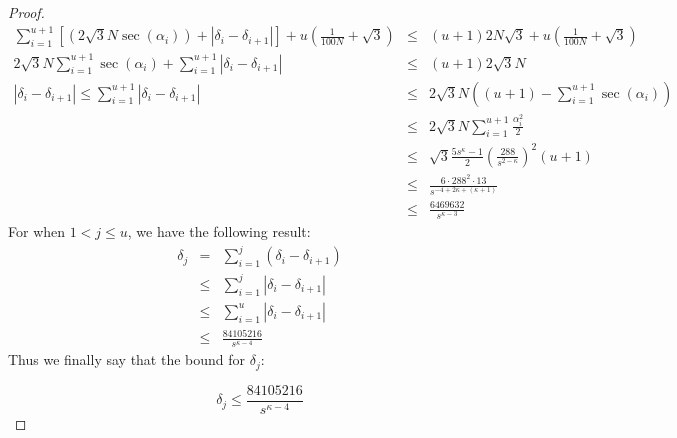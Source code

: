 \documentclass[10pt]{CSUNthesis}
\theoremstyle{plain}%
\theoremstyle{definition}
\theoremstyle{remark}
\newcommand{\lr}[1]{\left( #1 \right)}
\newcommand{\vlr}[1]{\left\vert #1 \right\vert}
\begin{document}
\begin{proof}
\begin{eqnarray*}
\sum_{i=1}^{u+1} \left[ \lr{2 \sqrt{3} N \sec \lr{ \alpha_i}} + \vlr{\delta_i - \delta_{i+1}} \right] + u \lr{\frac{1}{100N}+\sqrt{3}} &\leq& (u+1) 2 N \sqrt{3} + u  \lr{\frac{1}{100N}+\sqrt{3}}\\
2 \sqrt{3} N \sum_{i=1}^{u+1} \sec \lr{ \alpha_i} + \sum_{i=1}^{u+1} \vlr{\delta_i - \delta_{i+1}} &\leq& (u+1) 2 \sqrt{3} N \\
\vlr{\delta_i - \delta_{i+1}}\leq \sum_{i=1}^{u+1}\vlr{\delta_i - \delta_{i+1}} &\leq&  2 \sqrt{3} N \lr{(u+1) - \sum_{i=1}^{u+1} \sec \lr{ \alpha_i}}\\
&\leq& 2 \sqrt{3} N \sum_{i=1}^{u+1} \frac{\alpha_i^2}{2}\\
&\leq&  \sqrt{3} \frac{5s^\kappa - 1}{2} \lr{\frac{288}{s^{2-\kappa}}}^2 (u+1)\\ 
&\leq& \frac{6 \cdot 288^2 \cdot 13}{s^{-4+2\kappa + \lr{\kappa + 1}}}\\
&\leq&\frac{6469632}{s^{\kappa-3}}
\end{eqnarray*}
For when $1< j\leq u$, we have the following result:
\begin{eqnarray*}
\delta_j &=& \sum_{i=1}^{j} \lr{\delta_i - \delta_{i+1}}\\
&\leq&\sum_{i=1}^{j} \vlr{\delta_i - \delta_{i+1}}\\
&\leq& \sum_{i=1}^{u} \vlr{\delta_i - \delta_{i+1}}\\
&\leq&  \frac{84105216}{s^{\kappa-4}}
\end{eqnarray*}
Thus we finally say that the bound for $\delta_j$:

\begin{equation}\label{eqn:verticalBound}
\delta_j \leq \frac{84105216}{s^{\kappa-4}}
\end{equation}



\end{proof}
\end{document}
